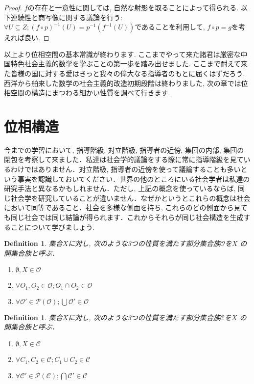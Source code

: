 \documentclass[lualatex]{ltjsbook}
\newtheorem{definition}[theorem]{Definition}
\theoremstyle{remark}
\theoremstyle{plain}
\begin{document}
\begin{proof}%
	$f$の存在と一意性に関しては,  自然な射影を取ることによって得られる. 以下連続性と商写像に関する議論を行う:
	 $\forall U \subseteq Z; \left( f\circ p \right) ^{-1}(U) = p^{-1}(f^{-1}(U))$であることを利用して,  $f\circ p =g$を考えれば良い. 
\end{proof}

以上より位相空間の基本常識が終わります. ここまでやって来た諸君は厳密な中国特色社会主義的数学を学ぶことの第一歩を踏み出せました. ここまで耐えて来た皆様の国に対する愛はきっと我々の偉大なる指導者のもとに届くはずだろう. 西洋から舶来した数学の社会主義的改造初期段階は終わりました,  次の章では位相空間の構造にまつわる細かい性質を調べて行きます.

\section{位相構造}
今までの学習において,  指導階級,  対立階級,  指導者の近傍,  集団の内部,  集団の閉包を考察して来ました．私達は社会学的議論をする際に常に指導階級を見ているわけではありません．対立階級,  指導者の近傍を使って議論することも多いという事実を認識しておいてください．世界の他のところにいる社会学者は私達の研究手法と異なるかもしれません．ただし,  上記の概念を使っているならば,  同じ社会学を研究していることが違いません．なぜかというとこれらの概念は社会において同等であること．社会を多様な側面を持ち,  これらのどの側面から見ても同じ社会では同じ結論が得られます．これからそれらが同じ社会構造を生成することについて学びましょう.

\begin{definition}
	集合$X$に対し,  次のような3つの性質を満たす部分集合族$\mathcal{O}$を$X$ の開集合族と呼ぶ．
	\begin{enumerate}
		\item $\emptyset ,  X \in \mathcal{O}$ 
	\item $\forall O_1,  O_2 \in  \mathcal{O} ;O_1 \cap O_2 \in \mathcal{O}$ 
		\item $\forall \mathcal{O}' \in \mathcal{P}(\mathcal{O}); \bigcup \mathcal{O}' \in \mathcal{O} $
	\end{enumerate}
\end{definition}

\begin{definition}
	集合$X$に対し,  次のような3つの性質を満たす部分集合族$\mathcal{C}$を$X$ の開集合族と呼ぶ．
	\begin{enumerate}
		\item $\emptyset , X \in \mathcal{C}$ 
		\item $\forall C_1 ,  C_2 \in  \mathcal{C}; C_1 \cup C_2 \in \mathcal{C}$ 
		\item $\forall \mathcal{C}' \in \mathcal{P}(\mathcal{C}); \bigcap \mathcal{C}' \in \mathcal{C} $

	\end{enumerate}
\end{definition}
\end{document}
